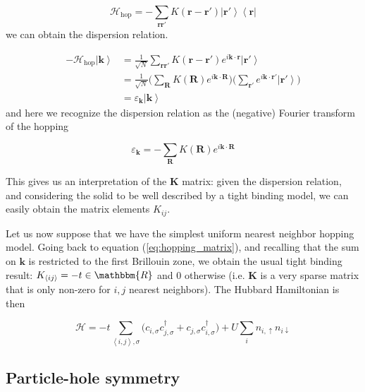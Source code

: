 \begin{equation}
\mathcal{H}_{\text{hop}} = - \sum_{\bm r \bm r'} K (\bm r - \bm r') \left| \bm r' \right\rangle \left\langle \bm r \right|
\end{equation}
we can obtain the dispersion relation.

\begin{equation}
\begin{split}
- \mathcal{H}_{\text{hop}} \left| \bm k \right\rangle &= \frac{1}{\sqrt{N}} \sum_{\bm r \bm r'} K ( \bm r - \bm r' ) e^{i \bm k \cdot \bm r} \left| \bm r' \right \rangle \\
&= \frac{1}{\sqrt{N}} \bigg( \sum_{\bm R} K(\bm R) e^{i\bm k \cdot \bm R} \bigg) \bigg( \sum_{\bm r'} e^{i\bm k \cdot \bm r'} \left| \bm r' \right\rangle \bigg) \\
& = \varepsilon_{\bm k} \left| \bm k \right\rangle
\end{split}
\end{equation}
and here we recognize the dispersion relation as the (negative) Fourier transform of the hopping

\begin{equation}
\varepsilon_{\bm k} = - \sum_{\bm R} K(\bm R) e^{i\bm k \cdot \bm R} 
\end{equation}

This gives us an interpretation of the $\bm K$ matrix: given the dispersion relation, and considering the solid to be well described by a tight binding model, we can easily obtain the matrix elements $K_{i j}$.

Let us now suppose that we have the simplest uniform nearest neighbor hopping model.
Going back to equation (\ref{eq:hopping_matrix}), and recalling that the sum on $\bm k$ is restricted to the first Brillouin zone, we obtain the usual tight binding result: $K_{\left\langle i j \right\rangle} = - t \in \mathbbm{R}$ and $0$ otherwise (i.e. $\bm K$ is a very sparse matrix that is only non-zero for $i, j$ nearest neighbors).
The Hubbard Hamiltonian is then

\begin{equation}\label{eq:hubbard_hamiltonian}
\mathcal{H} = - t \sum_{\left\langle i, j \right\rangle, \sigma} \bigg(c_{i,\sigma} c_{j,\sigma}^\dagger + c_{j,\sigma} c_{i,\sigma}^\dagger \bigg) + U \sum_{i} n_{i,\uparrow} n_{i\downarrow}
\end{equation}

\subsection{Particle-hole symmetry}

